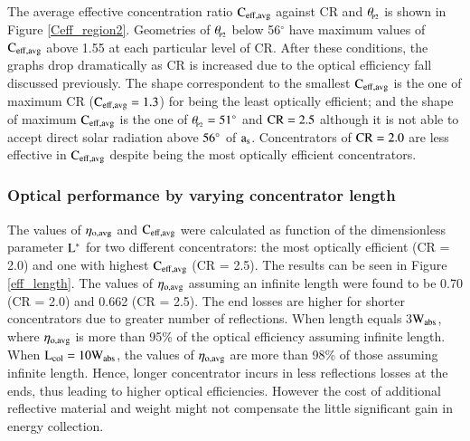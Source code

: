The average effective concentration ratio $\rm{C_{eff,avg}}$ against CR and $\theta_{\!_{\rm{P2}}}$ is shown in Figure \ref{Ceff_region2}. Geometries of $\theta_{\!_{\rm{P2}}}$ below 56$^{\circ}$ have maximum values of $\rm{C_{eff,avg}}$ above 1.55 at each particular level of CR. After these conditions, the graphs drop dramatically as CR is increased due to the optical efficiency fall discussed previously. The shape correspondent to the smallest $\rm{C_{eff,avg}}$ is the one of maximum CR ($\rm{C_{eff,avg} = 1.3}$) for being the least optically efficient; and the shape of maximum $\rm{C_{eff,avg}}$ is the one of $\theta_{\!_{\rm{P2}}} = 51^{\circ}$ and $\rm{CR = 2.5}$ although it is not able to accept direct solar radiation above $\rm{56^{\circ}}$ of $\rm{a_s}$. Concentrators of $\rm{CR = 2.0}$ are less effective in $\rm{C_{eff,avg}}$ despite being the most optically efficient concentrators.


\subsubsection{Optical performance by varying concentrator length} 

The values of ${\rm \eta_{o,avg}}$ and $\rm{C_{eff,avg}}$ were calculated as function of the dimensionless parameter $\rm{L^{*}}$ for two different concentrators: the most optically efficient (CR = 2.0) and one with highest $\rm{C_{eff,avg}}$ (CR = 2.5). The results can be seen in Figure \ref{eff_length}. The values of ${\rm \eta_{o,avg}}$ assuming an infinite length were found to be 0.70 (CR = 2.0) and 0.662 (CR = 2.5). The end losses are higher for shorter concentrators due to greater number of reflections. When length equals 3$\rm W_{abs}$, where $\rm \eta_{o,avg}$ is more than 95\% of the optical efficiency assuming infinite length. When $\rm{L_{col} = 10W_{abs}}$, the values of $\rm{\eta_{o,avg}}$ are more than 98\% of those assuming infinite length. Hence, longer concentrator incurs in less reflections losses at the ends, thus leading to higher optical efficiencies. However the cost of additional reflective material and weight might not compensate the little significant gain in energy collection.


